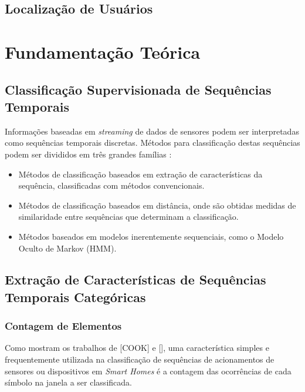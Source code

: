 \documentclass[
	12pt,				%
	openright,			%
	twoside,			%
	a4paper,			%
	english,			%
	spanish,			%
	brazil,				%
	]{abntex2}\usepackage[]{graphicx}\usepackage[]{color}
\begin{document}
\section{Localização de Usuários}



\chapter{Fundamentação Teórica}

\section{Classificação Supervisionada de Sequências Temporais}

Informações baseadas em \textit{streaming} de dados de sensores podem ser interpretadas como sequências temporais discretas. Métodos para classificação destas sequências podem ser divididos em três grandes famílias \cite{Xing2010}:

\begin{itemize}
	\item Métodos de classificação baseados em extração de características da sequência, classificadas com métodos convencionais.
	\item Métodos de classificação baseados em distância, onde são obtidas medidas de similaridade entre sequências que determinam a classificação.
	\item Métodos baseados em modelos inerentemente sequenciais, como o Modelo Oculto de Markov (HMM).
\end{itemize}

\section{Extração de Características de Sequências Temporais Categóricas}

\subsection{Contagem de Elementos}
\label{subcontagem}

Como mostram os trabalhos de [COOK] e [], uma característica simples e frequentemente utilizada na classificação de sequências de acionamentos de sensores ou dispositivos em \textit{Smart Homes} é a contagem das ocorrências de cada símbolo na janela a ser classificada.
\end{document}
